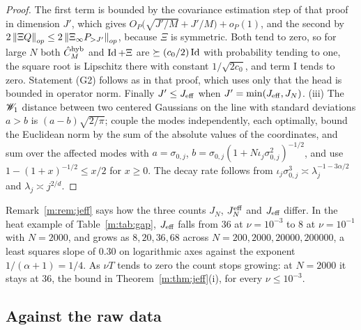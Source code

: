 \begin{proof}
The first term is bounded by the covariance estimation step of that proof in dimension $J'$, which gives $O_P\big(\sqrt{J'/M}+J'/M\big)+o_P(1)$, and the second by $2\left\|\Xi Q\right\|_{op}\le2\left\|\Xi_\infty P_{>J'}\right\|_{op}$, because $\Xi$ is symmetric. Both tend to zero, so for large $N$ both $\hat C^{\rm hyb}_M$ and $\operatorname{Id}+\Xi$ are $\succeq(c_0/2)\operatorname{Id}$ with probability tending to one, the square root is Lipschitz there with constant $1/\sqrt{2c_0}$, and term I tends to zero. Statement (G2) follows as in that proof, which uses only that the head is bounded in operator norm. Finally $J'\le J_{\rm eff}$ when $J'=\min(J_{\rm eff},J_N)$. (iii) The $\mathscr{W}_1$ distance between two centered Gaussians on the line with standard deviations $a>b$ is $(a-b)\sqrt{2/\pi}$; couple the modes independently, each optimally, bound the Euclidean norm by the sum of the absolute values of the coordinates, and sum over the affected modes with $a=\sigma_{0,j}$, $b=\sigma_{0,j}(1+N\iota_j\sigma_{0,j}^2)^{-1/2}$, and use $1-(1+x)^{-1/2}\le x/2$ for $x\ge0$. The decay rate follows from $\iota_j\sigma_{0,j}^3\asymp\lambda_j^{-1-3\alpha/2}$ and $\lambda_j\asymp j^{2/d}$.
\end{proof}

Remark~\ref{m:rem:jeff} says how the three counts $J_N$, $J^{\rm eff}_N$ and $J_{\rm eff}$ differ. In the heat example of Table~\ref{m:tab:gap}, $J_{\rm eff}$ falls from $36$ at $\nu=10^{-3}$ to $8$ at $\nu=10^{-1}$ with $N=2000$, and grows as $8,20,36,68$ across $N=200,2000,20000,200000$, a least squares slope of $0.30$ on logarithmic axes against the exponent $1/(\alpha+1)=1/4$. As $\nu T$ tends to zero the count stops growing: at $N=2000$ it stays at $36$, the bound in Theorem~\ref{m:thm:jeff}(i), for every $\nu\le10^{-3}$.

\subsection{Against the raw data}

